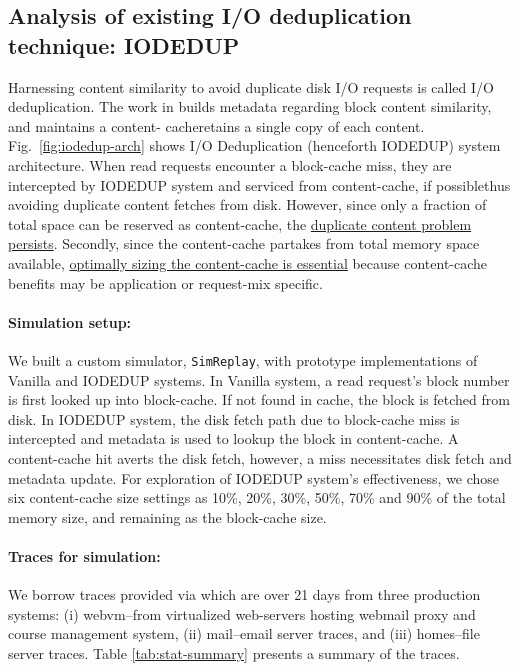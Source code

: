 \subsection{Analysis of existing I/O deduplication technique: IODEDUP}
Harnessing content similarity to avoid duplicate disk I/O requests is called I/O deduplication.
The work in \cite{iodedup} 
builds metadata regarding block content similarity, and maintains a content-
cache\textemdash{}retains a single copy of each content. Fig.~\ref{fig:iodedup-arch} 
shows I/O Deduplication (henceforth IODEDUP) system architecture. 
When read requests encounter a block-cache miss, they are 
intercepted by IODEDUP system and serviced from content-cache, if possible\textemdash{}thus avoiding 
duplicate content fetches from disk. However, since only a fraction of total space can be reserved
as content-cache, the \underline{duplicate content problem persists}. 
Secondly, since the content-cache
partakes from total memory space available, 
\underline{optimally sizing the content-cache is essential}
because content-cache benefits may be application or request-mix specific.

\vspace{-0.2in}
\paragraph{Simulation setup:} We built a custom simulator, \texttt{SimReplay}, 
with prototype implementations
of Vanilla and IODEDUP systems. In Vanilla system, a read request's block number is first
looked up into block-cache. If not found in cache, the block is fetched
from disk. In IODEDUP system, the disk fetch path due to block-cache miss is intercepted 
and metadata is used to lookup the block in content-cache. A content-cache hit averts
the disk fetch, however, a miss necessitates disk fetch and metadata update. For exploration of
IODEDUP system's effectiveness, we chose six content-cache size settings as 10\%, 20\%, 30\%,
50\%, 70\% and 90\% of the total memory size, and remaining as the block-cache size.

\vspace{-0.2in}
\paragraph{Traces for simulation:} We borrow traces provided via \cite{iodedup} 
which are over 21 days from three
production systems: (i) webvm--from virtualized web-servers hosting webmail proxy and course
management system, (ii) mail--email server traces, and (iii) homes--file server traces. 
Table \ref{tab:stat-summary}
presents a summary of the traces. %

